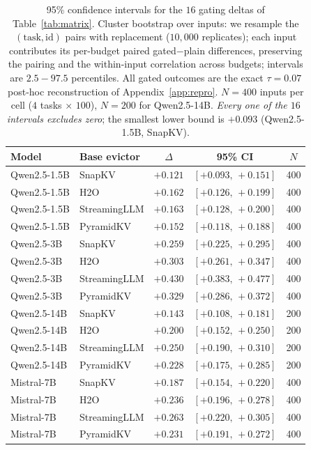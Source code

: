 \begin{table}[t]
\centering
\caption{95\% confidence intervals for the $16$ gating deltas of
Table~\ref{tab:matrix}. Cluster bootstrap over inputs: we resample the
$(\text{task}, \text{id})$ pairs with replacement ($10{,}000$ replicates);
each input contributes its per-budget paired gated$-$plain differences,
preserving the pairing and the within-input correlation across budgets;
intervals are $2.5-97.5$ percentiles. All gated outcomes are the exact
$\tau = 0.07$ post-hoc reconstruction of Appendix~\ref{app:repro}.
$N = 400$ inputs per cell ($4$ tasks $\times$ $100$), $N = 200$ for
Qwen2.5-14B. \emph{Every one of the $16$ intervals excludes zero}; the
smallest lower bound is $+0.093$ (Qwen2.5-1.5B, SnapKV).}
\label{tab:matrix-ci}
\begin{tabular}{llccc}
\toprule
Model & Base evictor & $\Delta$ & 95\% CI & $N$ \\
\midrule
Qwen2.5-1.5B & SnapKV       & $+0.121$ & $[+0.093,\,+0.151]$ & 400 \\
Qwen2.5-1.5B & H2O          & $+0.162$ & $[+0.126,\,+0.199]$ & 400 \\
Qwen2.5-1.5B & StreamingLLM & $+0.163$ & $[+0.128,\,+0.200]$ & 400 \\
Qwen2.5-1.5B & PyramidKV    & $+0.152$ & $[+0.118,\,+0.188]$ & 400 \\
\midrule
Qwen2.5-3B   & SnapKV       & $+0.259$ & $[+0.225,\,+0.295]$ & 400 \\
Qwen2.5-3B   & H2O          & $+0.303$ & $[+0.261,\,+0.347]$ & 400 \\
Qwen2.5-3B   & StreamingLLM & $+0.430$ & $[+0.383,\,+0.477]$ & 400 \\
Qwen2.5-3B   & PyramidKV    & $+0.329$ & $[+0.286,\,+0.372]$ & 400 \\
\midrule
Qwen2.5-14B  & SnapKV       & $+0.143$ & $[+0.108,\,+0.181]$ & 200 \\
Qwen2.5-14B  & H2O          & $+0.200$ & $[+0.152,\,+0.250]$ & 200 \\
Qwen2.5-14B  & StreamingLLM & $+0.250$ & $[+0.190,\,+0.310]$ & 200 \\
Qwen2.5-14B  & PyramidKV    & $+0.228$ & $[+0.175,\,+0.285]$ & 200 \\
\midrule
Mistral-7B   & SnapKV       & $+0.187$ & $[+0.154,\,+0.220]$ & 400 \\
Mistral-7B   & H2O          & $+0.236$ & $[+0.196,\,+0.278]$ & 400 \\
Mistral-7B   & StreamingLLM & $+0.263$ & $[+0.220,\,+0.305]$ & 400 \\
Mistral-7B   & PyramidKV    & $+0.231$ & $[+0.191,\,+0.272]$ & 400 \\
\bottomrule
\end{tabular}
\end{table}


